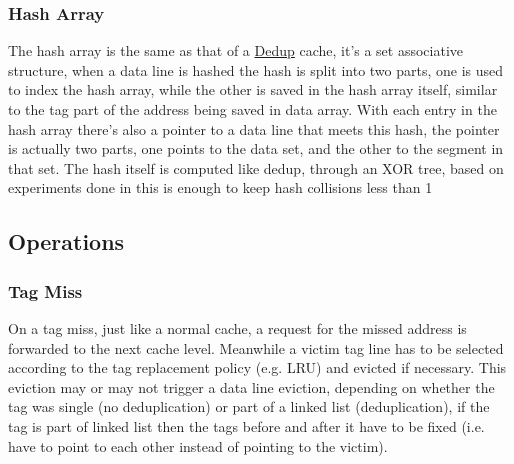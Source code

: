 \subsubsection{Hash Array}
\label{sssec:DedupBDIHash}
The hash array is the same as that of a \hyperref[sssec:DedupHash]{Dedup} cache, it's a set associative structure, when a data line is hashed the hash is split into two parts, one is used to index the hash array, while the other is saved in the hash array itself, similar to the tag part of the address being saved in data array. With each entry in the hash array there's also a pointer to a data line that meets this hash, the pointer is actually two parts, one points to the data set, and the other to the segment in that set. The hash itself is computed like dedup, through an XOR tree, based on experiments done in \cite{tian2014last} this is enough to keep hash collisions less than 1%

\subsection{Operations}
\label{ssec:DedupBDIOperations}
\subsubsection{Tag Miss}
On a tag miss, just like a normal cache, a request for the missed address is forwarded to the next cache level. Meanwhile a victim tag line has to be selected according to the tag replacement policy (e.g. LRU) and evicted if necessary. This eviction may or may not trigger a data line eviction, depending on whether the tag was single (no deduplication) or part of a linked list (deduplication), if the tag is part of linked list then the tags before and after it have to be fixed (i.e. have to point to each other instead of pointing to the victim).


